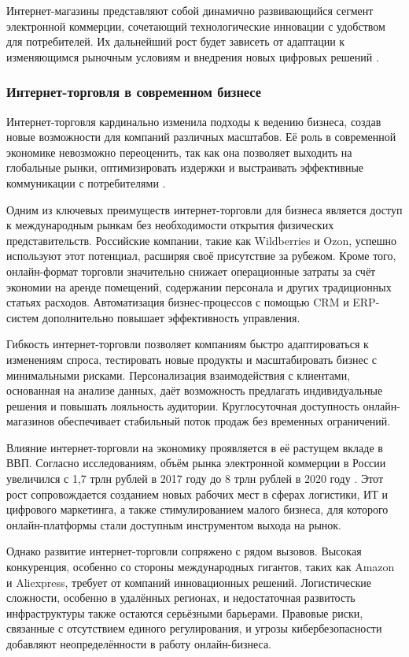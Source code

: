  Интернет-магазины представляют собой динамично развивающийся сегмент электронной коммерции, сочетающий технологические инновации с удобством для потребителей. Их дальнейший рост будет зависеть от адаптации к изменяющимся рыночным условиям и внедрения новых цифровых решений \cite{4}.
 
\subsubsection{Интернет-торговля в современном бизнесе}

Интернет-торговля кардинально изменила подходы к ведению бизнеса, создав новые возможности для компаний различных масштабов. Её роль в современной экономике невозможно переоценить, так как она позволяет выходить на глобальные рынки, оптимизировать издержки и выстраивать эффективные коммуникации с потребителями \cite{5}.

Одним из ключевых преимуществ интернет-торговли для бизнеса является доступ к международным рынкам без необходимости открытия физических представительств. Российские компании, такие как Wildberries и Ozon, успешно используют этот потенциал, расширяя своё присутствие за рубежом. Кроме того, онлайн-формат торговли значительно снижает операционные затраты за счёт экономии на аренде помещений, содержании персонала и других традиционных статьях расходов. Автоматизация бизнес-процессов с помощью CRM и ERP-систем дополнительно повышает эффективность управления.

Гибкость интернет-торговли позволяет компаниям быстро адаптироваться к изменениям спроса, тестировать новые продукты и масштабировать бизнес с минимальными рисками. Персонализация взаимодействия с клиентами, основанная на анализе данных, даёт возможность предлагать индивидуальные решения и повышать лояльность аудитории. Круглосуточная доступность онлайн-магазинов обеспечивает стабильный поток продаж без временных ограничений.

Влияние интернет-торговли на экономику проявляется в её растущем вкладе в ВВП. Согласно исследованиям, объём рынка электронной коммерции в России увеличился с 1,7 трлн рублей в 2017 году до 8 трлн рублей в 2020 году \cite{6}. Этот рост сопровождается созданием новых рабочих мест в сферах логистики, ИТ и цифрового маркетинга, а также стимулированием малого бизнеса, для которого онлайн-платформы стали доступным инструментом выхода на рынок.

Однако развитие интернет-торговли сопряжено с рядом вызовов. Высокая конкуренция, особенно со стороны международных гигантов, таких как Amazon и Aliexpress, требует от компаний инновационных решений. Логистические сложности, особенно в удалённых регионах, и недостаточная развитость инфраструктуры также остаются серьёзными барьерами. Правовые риски, связанные с отсутствием единого регулирования, и угрозы кибербезопасности добавляют неопределённости в работу онлайн-бизнеса.

